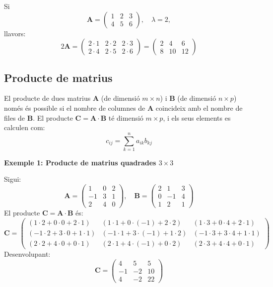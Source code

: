 \documentclass[12pt]{article}
\newcommand{\mat}[1]{\mathbf{#1}}
\begin{document}
\begin{exemple}
Si
\[
\mat{A} = \begin{pmatrix}
1 & 2 & 3 \\
4 & 5 & 6
\end{pmatrix}, \quad \lambda = 2,
\]
llavors:
\[
2\mat{A} = \begin{pmatrix}
2\cdot1 & 2\cdot2 & 2\cdot3 \\
2\cdot4 & 2\cdot5 & 2\cdot6
\end{pmatrix} =
\begin{pmatrix}
2 & 4 & 6 \\
8 & 10 & 12
\end{pmatrix}
\]
\end{exemple}

\subsection{Producte de matrius}
\begin{concept}
El producte de dues matrius $\mat{A}$ (de dimensió $m \times n$) i $\mat{B}$ (de dimensió $n \times p$) només és possible si el nombre de columnes de $\mat{A}$ coincideix amb el nombre de files de $\mat{B}$. El producte $\mat{C} = \mat{A} \cdot \mat{B}$ té dimensió $m \times p$, i els seus elements es calculen com:
\[
c_{ij} = \sum_{k=1}^n a_{ik} b_{kj}
\]
\end{concept}

\begin{exemple}
\textbf{Exemple 1: Producte de matrius quadrades $3 \times 3$}

Sigui:
\[
\mat{A} = \begin{pmatrix}
1 & 0 & 2 \\
-1 & 3 & 1 \\
2 & 4 & 0
\end{pmatrix}, \quad
\mat{B} = \begin{pmatrix}
2 & 1 & 3 \\
0 & -1 & 4 \\
1 & 2 & 1
\end{pmatrix}
\]
El producte $\mat{C} = \mat{A} \cdot \mat{B}$ és:
\[
\mat{C} = \begin{pmatrix}
(1\cdot2 + 0\cdot0 + 2\cdot1) & (1\cdot1 + 0\cdot(-1) + 2\cdot2) & (1\cdot3 + 0\cdot4 + 2\cdot1) \\
(-1\cdot2 + 3\cdot0 + 1\cdot1) & (-1\cdot1 + 3\cdot(-1) + 1\cdot2) & (-1\cdot3 + 3\cdot4 + 1\cdot1) \\
(2\cdot2 + 4\cdot0 + 0\cdot1) & (2\cdot1 + 4\cdot(-1) + 0\cdot2) & (2\cdot3 + 4\cdot4 + 0\cdot1)
\end{pmatrix}
\]
Desenvolupant:
\[
\mat{C} = \begin{pmatrix}
4 & 5 & 5 \\
-1 & -2 & 10 \\
4 & -2 & 22
\end{pmatrix}
\]
\end{exemple}
\end{document}
